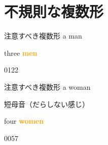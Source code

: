 \documentclass[aspectratio=169,xcolor={dvipsnames,table}]{beamer}
\newcommand{\myaudio}[1]{\href{#1}{\faVolumeUp}}
\begin{document}
\section{不規則な複数形}
\begin{frame}[plain]{注意すべき複数形}
\scalebox{5}{\ManFace}\hspace{15pt}
\pause
{\LARGE a man}\pause{}
\pause
\hfill{\textipa{/\ae /}}\pause

\bigskip

\bigskip

\scalebox{5}{\ManFace\hspace{5pt}\ManFace\hspace{5pt}\ManFace}\hspace{15pt}
\pause
{\LARGE three  \textcolor{orange}{\bfseries men}}\pause{}

\bigskip

\bigskip

\mbox{}\hfill{\tiny 0122}\,{\scriptsize \myaudio{./audio/005_singular_plural_08.mp3}}
\end{frame}
\begin{frame}[plain]{注意すべき複数形}
\scalebox{5}{\WomanFace}\pause\hspace{15pt} {\LARGE a woman}%
\pause{}
\pause
\hfill{\scriptsize {}}

\hfill{\scriptsize 短母音（だらしない感じ）}\pause

\bigskip

\bigskip

\scalebox{5}{\WomanFace \WomanFace \WomanFace \WomanFace} \hspace{25pt}
\pause
{\LARGE four  \textcolor{orange}{\bfseries women}}%
\pause{}%


\bigskip

\bigskip

\mbox{}\hfill{\tiny 0057}\,{\scriptsize \myaudio{./audio/005_singular_plural_09.mp3}}
\end{frame}
\end{document}
